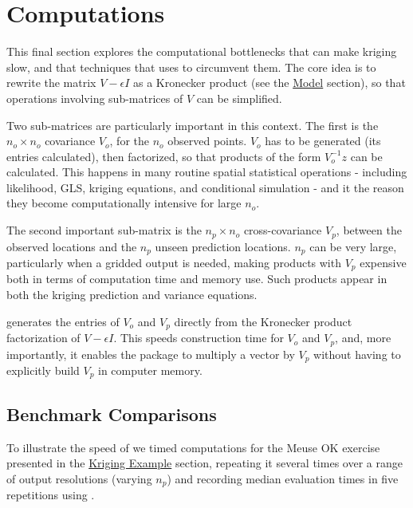 \hypertarget{computations}{%
\section{Computations}\label{computations}}

This final section explores the computational bottlenecks that can make kriging slow, and that techniques that  uses to circumvent them. The core idea is to rewrite the matrix \(V - \epsilon I\) as a Kronecker product (see the \protect\hyperlink{model}{Model} section), so that operations involving sub-matrices of \(V\) can be simplified.

Two sub-matrices are particularly important in this context. The first is the \(n_o \times n_o\) covariance \(V_o\), for the \(n_o\) observed points. \(V_o\) has to be generated (its entries calculated), then factorized, so that products of the form \(V_o^{-1} z\) can be calculated. This happens in many routine spatial statistical operations - including likelihood, GLS, kriging equations, and conditional simulation - and it the reason they become computationally intensive for large \(n_o\).

The second important sub-matrix is the \(n_p \times n_o\) cross-covariance \(V_p\), between the observed locations and the \(n_p\) unseen prediction locations. \(n_p\) can be very large, particularly when a gridded output is needed, making products with \(V_p\) expensive both in terms of computation time and memory use. Such products appear in both the kriging prediction and variance equations.

 generates the entries of \(V_o\) and \(V_p\) directly from the Kronecker product factorization of \(V - \epsilon I\). This speeds construction time for \(V_o\) and \(V_p\), and, more importantly, it enables the package to multiply a vector by \(V_p\) without having to explicitly build \(V_p\) in computer memory.

\hypertarget{benchmark-comparisons}{%
\subsection{Benchmark Comparisons}\label{benchmark-comparisons}}

To illustrate the speed of  we timed computations for the Meuse OK exercise presented in the \protect\hyperlink{kriging-example}{Kriging Example} section, repeating it several times over a range of output resolutions (varying \(n_p\)) and recording median evaluation times in five repetitions using .

